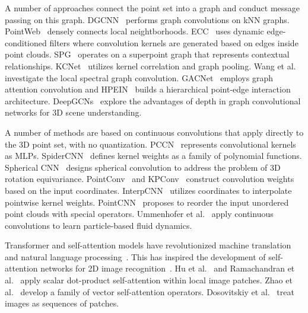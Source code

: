 A number of approaches connect the point set into a graph and conduct message passing on this graph. DGCNN~\cite{wang2019dgcnn} performs graph convolutions on kNN graphs. PointWeb~\cite{zhao2019pointweb} densely connects local neightborhoods.
ECC~\cite{simonovsky2017dynamic} uses dynamic edge-conditioned filters where convolution kernels are generated based on edges inside point clouds. SPG~\cite{landrieu2018spg} operates on a superpoint graph that represents contextual relationships. KCNet~\cite{shen2018mining} utilizes kernel correlation and graph pooling. Wang et al.~\cite{wang2018local} investigate the local spectral graph convolution. %
GACNet~\cite{wang2019graph} employs graph attention convolution and HPEIN~\cite{jiang2019hpein} builds a hierarchical point-edge interaction architecture. DeepGCNs~\cite{li2019deepgcns} explore the advantages of depth in graph convolutional networks for 3D scene understanding.

A number of methods are based on continuous convolutions that apply directly to the 3D point set, with no quantization. PCCN~\cite{wang2018pccn} represents convolutional kernels as MLPs. SpiderCNN~\cite{xu2018spidercnn} defines kernel weights as a family of polynomial functions. Spherical CNN~\cite{esteves2018learning} designs spherical convolution to address the problem of 3D rotation equivariance. PointConv~\cite{wu2019pointconv} and KPConv~\cite{thomas2019kpconv} construct convolution weights based on the input coordinates. InterpCNN~\cite{mao2019interpolated} utilizes coordinates to interpolate pointwise kernel weights. PointCNN~\cite{li2018pointcnn} proposes to reorder the input unordered point clouds with special operators. Ummenhofer et al.~\cite{Ummenhofer2020} apply continuous convolutions to learn particle-based fluid dynamics.

Transformer and self-attention models have revolutionized machine translation and natural language processing~\cite{vaswani2017attention,wu2019pay,Devlin2018,dai2019transformer,Yang2019xlnet}.
This has inspired the development of self-attention networks for 2D image recognition~\cite{hu2019local,ramachandran2019stand,zhao2020san,dosovitskiy2021image}. Hu et al.~\cite{hu2019local} and Ramachandran et al.~\cite{ramachandran2019stand} apply scalar dot-product self-attention within local image patches. Zhao et al.~\cite{zhao2020san} develop a family of vector self-attention operators. Dosovitskiy et al.~\cite{dosovitskiy2021image} treat images as sequences of patches.


